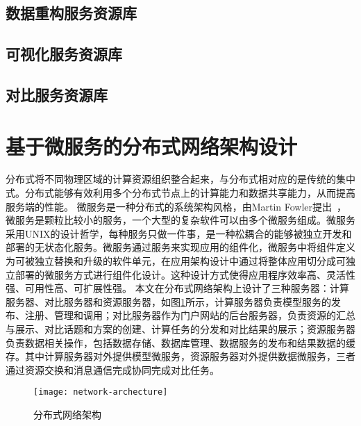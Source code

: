 \subsection{数据重构服务资源库}



\subsection{可视化服务资源库}



\subsection{对比服务资源库}


\section{基于微服务的分布式网络架构设计}
分布式将不同物理区域的计算资源组织整合起来，与分布式相对应的是传统的集中式。分布式能够有效利用多个分布式节点上的计算能力和数据共享能力，从而提高服务端的性能。
微服务是一种分布式的系统架构风格，由Martin Fowler提出~\cite{fowler2014microservices}，微服务是颗粒比较小的服务，一个大型的复杂软件可以由多个微服务组成。微服务采用UNIX的设计哲学，每种服务只做一件事，是一种松耦合的能够被独立开发和部署的无状态化服务。微服务通过服务来实现应用的组件化，微服务中将组件定义为可被独立替换和升级的软件单元，在应用架构设计中通过将整体应用切分成可独立部署的微服务方式进行组件化设计。这种设计方式使得应用程序效率高、灵活性强、可用性高、可扩展性强。
本文在分布式网络架构上设计了三种服务器：计算服务器、对比服务器和资源服务器，如图\ref{fig:network-archecture}所示，计算服务器负责模型服务的发布、注册、管理和调用；对比服务器作为门户网站的后台服务器，负责资源的汇总与展示、对比话题和方案的创建、计算任务的分发和对比结果的展示；资源服务器负责数据相关操作，包括数据存储、数据库管理、数据服务的发布和结果数据的缓存。其中计算服务器对外提供模型微服务，资源服务器对外提供数据微服务，三者通过资源交换和消息通信完成协同完成对比任务。

\begin{figure}[!htbp]
    \centering
    \texttt{[image: network-archecture]}
    \caption{分布式网络架构}
    \label{fig:network-archecture}
\end{figure}

